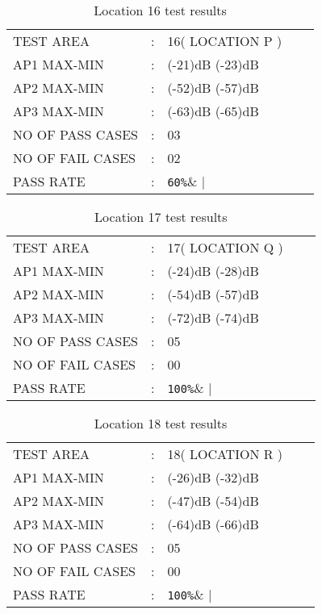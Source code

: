 \documentclass{report}
\begin{document}
	\begin{table}[H]
		\centering
		\label{LOCATION SIXTEEN TEST}
		\begin{tabular}{lllll}
			TEST AREA& :&  16( LOCATION P )&    \\
			AP1 MAX-MIN& :& (-21)dB (-23)dB&  \\
			AP2 MAX-MIN& :& (-52)dB (-57)dB&   \\
			AP3 MAX-MIN& :& (-63)dB (-65)dB&   \\
			NO OF PASS CASES& :& 03&  \\
			NO OF FAIL CASES& :& 02&   \\
			PASS RATE& :& \verb|60%|&   
		\end{tabular}
		\caption{Location 16 test results}
	\end{table}
	
	\begin{table}[H]
		\centering
		\label{LOCATION SEVENTEEN TEST}
		\begin{tabular}{lllll}
			TEST AREA& :&  17( LOCATION Q )&    \\
			AP1 MAX-MIN& :& (-24)dB (-28)dB&  \\
			AP2 MAX-MIN& :& (-54)dB (-57)dB&   \\
			AP3 MAX-MIN& :& (-72)dB (-74)dB&   \\
			NO OF PASS CASES& :& 05&  \\
			NO OF FAIL CASES& :& 00&   \\
			PASS RATE& :& \verb|100%|&   
		\end{tabular}
		\caption{Location 17 test results}
	\end{table}
	
	\begin{table}[H]
		\centering
		\label{LOCATION EIGHTEEN TEST}
		\begin{tabular}{lllll}
			TEST AREA& :&  18( LOCATION R )&    \\
			AP1 MAX-MIN& :& (-26)dB (-32)dB&  \\
			AP2 MAX-MIN& :& (-47)dB (-54)dB&   \\
			AP3 MAX-MIN& :& (-64)dB (-66)dB&   \\
			NO OF PASS CASES& :& 05&  \\
			NO OF FAIL CASES& :& 00&   \\
			PASS RATE& :& \verb|100%|&   
		\end{tabular}
		\caption{Location 18 test results}
	\end{table}
\end{document}
